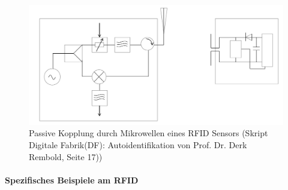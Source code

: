 \documentclass[a4paper,12pt]{scrartcl}
\begin{document}
\begin{figure}[H]
\centering
\includegraphics[scale=0.28]{picture/mikrowellen}
\caption{Passive Kopplung durch Mikrowellen eines RFID Sensors (Skript Digitale Fabrik(DF): Autoidentifikation von Prof. Dr. Derk Rembold, Seite 17))}
\label{fig:Passive Kopplung durch Mikrowellen eines RFID Sensors}
\end{figure}

\paragraph{Spezifisches Beispiele am RFID\cite{https://www.reutlingen.ihk.de/fileadmin/user_upload/www.reutlingen.ihk.de/RFID.pdf, Seite 8 ff.}}
\end{document}
